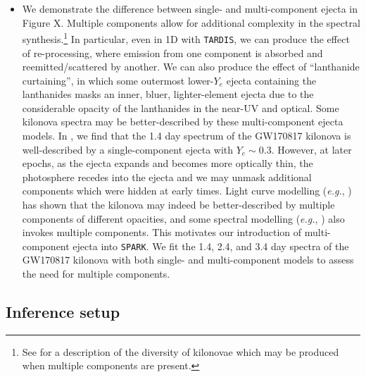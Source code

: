 \documentclass[twocolumn, twocolappendix]{aastex63}
\def\SPARK{\texttt{SPARK}}
\def\TARDIS{\texttt{TARDIS}}
\def\eg{{\it e.g.}}
\begin{document}
\begin{itemize}
    \item We demonstrate the difference between single- and multi-component ejecta in Figure X. Multiple components allow for additional complexity in the spectral synthesis.\footnote{See \cite{kawaguchi20} for a description of the diversity of kilonovae which may be produced when multiple components are present.} In particular, even in 1D with \TARDIS, we can produce the effect of re-processing, where emission from one component is absorbed and reemitted/scattered by another. We can also produce the effect of ``lanthanide curtaining'', in which some outermost lower-$Y_e$ ejecta containing the lanthanides masks an inner, bluer, lighter-element ejecta due to the considerable opacity of the lanthanides in the near-UV and optical. Some kilonova spectra may be better-described by these multi-component ejecta models. In \cite{vieira23}, we find that the 1.4 day spectrum of the GW170817 kilonova is well-described by a single-component ejecta with $Y_e \sim 0.3$. However, at later epochs, as the ejecta expands and becomes more optically thin, the photosphere recedes into the ejecta and we may unmask additional components which were hidden at early times. Light curve modelling (\eg, \citealt{villar17}) has shown that the kilonova may indeed be better-described by multiple components of different opacities, and some spectral modelling (\eg, \citealt{kasen17}) also invokes multiple components. This motivates our introduction of multi-component ejecta into \SPARK. We fit the 1.4, 2.4, and 3.4 day spectra of the GW170817 kilonova with both single- and multi-component models to assess the need for multiple components.

\end{itemize}



\subsection{Inference setup}\label{ssc:inference-setup}
\end{document}
